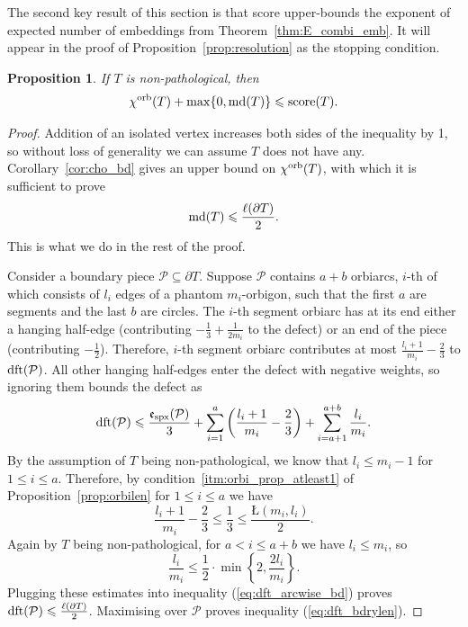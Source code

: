 \documentclass{amsart}
\newtheorem{proposition}[conjecture]{Proposition}
\newcommand{\cho}{\chi^{\textnormal{orb}}}
\newcommand{\dft}{\textnormal{dft}}
\newcommand{\md}{\textnormal{md}}
\newcommand{\tn}{\textnormal}
\begin{document}
The second key result of this section is that score upper-bounds the exponent of expected number of embeddings from Theorem~\ref{thm:E_combi_emb}. It will appear in the proof of Proposition~\ref{prop:resolution} as the stopping condition.
\begin{proposition}\label{prop:score_bd}
If $T$ is non-pathological, then
\begin{equation*}
\cho(T)+\max\{0,\md(T)\}\leqslant\tn{score}(T).
\end{equation*}
\end{proposition}
\begin{proof}
Addition of an isolated vertex increases both sides of the inequality by 1, so without loss of generality we can assume $T$ does not have any. Corollary~\ref{cor:cho_bd} gives an upper bound on $\cho(T)$, with which it is sufficient to prove
\begin{equation}\label{eq:dft_bdrylen}
\md(T)\leqslant\frac{\ell(\partial T)}{2}.
\end{equation}
This is what we do in the rest of the proof.

Consider a boundary piece $\mathcal{P}\subseteq\partial T$. Suppose $\mathcal{P}$ contains $a+b$ orbiarcs, $i$-th of which consists of $l_i$ edges of a phantom $m_i$-orbigon, such that the first $a$ are segments and the last $b$ are circles. The $i$-th segment orbiarc has at its end either a hanging half-edge (contributing $-\tfrac{1}{3}+\tfrac{1}{2m_i}$ to the defect) or an end of the piece (contributing $-\tfrac{1}{2}$). Therefore, $i$-th segment orbiarc contributes at most $\tfrac{l_i+1}{m_i}-\tfrac{2}{3}$ to $\dft(\mathcal{P})$. All other hanging half-edges enter the defect with negative weights, so ignoring them bounds the defect as
\begin{equation}\label{eq:dft_arcwise_bd}
\dft(\mathcal{P})\leqslant\frac{\mathfrak{e}_\tn{spx}(\mathcal{P})}{3}+\sum_{i=1}^a\left(\frac{l_i+1}{m_i}-\frac{2}{3}\right)+\sum_{i=a+1}^{a+b}\frac{l_i}{m_i}.
\end{equation}
By the assumption of $T$ being non-pathological, we know that $l_i\leqslant m_i-1$ for $1\leqslant i\leqslant a$. Therefore, by condition~\ref*{itm:orbi_prop_atleast1} of Proposition~\ref{prop:orbilen} for $1\leqslant i\leqslant a$ we have
\begin{equation*}
\frac{l_i+1}{m_i}-\frac{2}{3}\leqslant\frac{1}{3}\leqslant\frac{Ł(m_i,l_i)}{2}.
\end{equation*}
Again by $T$ being non-pathological, for $a<i\leqslant a+b$ we have $l_i\leqslant m_i$, so
\begin{equation*}
\frac{l_i}{m_i}\leqslant\frac{1}{2}\cdot\min\left\{2,\frac{2l_i}{m_i}\right\}.
\end{equation*}
Plugging these estimates into inequality (\ref{eq:dft_arcwise_bd}) proves $\dft(\mathcal{P})\leqslant\tfrac{\ell(\partial T)}{2}$. Maximising over $\mathcal{P}$ proves inequality (\ref{eq:dft_bdrylen}).
\end{proof}
\end{document}
